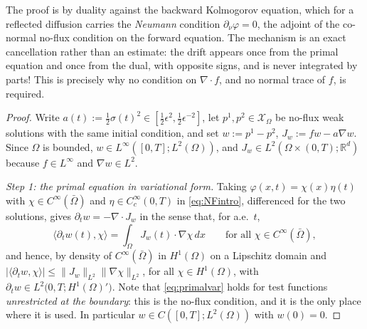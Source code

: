 \documentclass[11pt]{amsart}
\theoremstyle{definition}
\newcommand{\dive}{\nabla\!\cdot}
\newcommand{\R}{\mathbb{R}}
\newcommand{\dd}{\,d}
\begin{document}
The proof is by duality against the backward Kolmogorov equation,
which for a reflected diffusion carries the \emph{Neumann} condition
$\partial_\nu\varphi=0$, the adjoint of the co-normal no-flux
condition on the forward equation. The mechanism is an exact
cancellation rather than an estimate: the drift appears once from
the primal equation and once from the dual, with opposite signs, and
is never integrated by parts! This is precisely why no condition on
$\dive f$, and no normal trace of $f$, is required.

\begin{proof}
Write $a(t):=\tfrac12\sigma(t)^2\in[\tfrac12\epsilon^2,
\tfrac12\epsilon^{-2}]$, let $p^1,p^2\in\mathcal{X}_\Omega$ be
no-flux weak solutions with the same initial condition, and set $w:=p^1-p^2$,
$J_w:=fw-a\nabla w$. Since $\Omega$ is bounded, $w\in
L^\infty([0,T];L^2(\Omega))$, and $J_w\in
L^2(\Omega\times(0,T);\R^d)$ because $f\in L^\infty$ and $\nabla
w\in L^2$.

\emph{Step 1: the primal equation in variational form.} Taking
$\varphi(x,t)=\chi(x)\eta(t)$ with $\chi\in C^\infty(\bar\Omega)$
and $\eta\in C_c^\infty(0,T)$ in \eqref{eq:NFintro}, differenced for
the two solutions, gives $\partial_t w=-\dive J_w$ in the sense
that, for a.e.\ $t$,
\begin{equation}\label{eq:primalvar}
\big\langle\partial_tw(t),\chi\big\rangle
=\int_\Omega J_w(t)\cdot\nabla\chi\dd x
\qquad\text{for all }\chi\in C^\infty(\bar\Omega),
\end{equation}
and hence, by density of $C^\infty(\bar\Omega)$ in $H^1(\Omega)$ on
a Lipschitz domain and $|\langle\partial_tw,\chi\rangle|\le
\|J_w\|_{L^2}\|\nabla\chi\|_{L^2}$, for all $\chi\in H^1(\Omega)$,
with $\partial_tw\in L^2\big(0,T;H^1(\Omega)'\big)$. Note that
\eqref{eq:primalvar} holds for test functions \emph{unrestricted at
the boundary}: this is the no-flux condition, and it is the only
place where it is used. In particular $w\in C([0,T];L^2(\Omega))$
with $w(0)=0$.


\end{proof}
\end{document}
